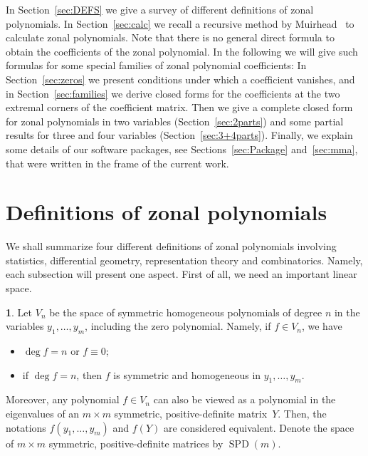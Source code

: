 \documentclass{mathincs}
\numberwithin{equation}{section}
\numberwithin{figure}{section}
\theoremstyle{plain}
\theoremstyle{definition}
\newtheorem{defn}[thm]{\protect\definitionname}
\theoremstyle{remark}
\theoremstyle{plain}
\theoremstyle{definition}
\theoremstyle{plain}
\theoremstyle{plain}
\newcommand{\SPD}{\operatorname{SPD}}
\providecommand{\definitionname}{Definition}
\begin{document}
In Section~\ref{sec:DEFS} we give a survey
of different definitions of zonal polynomials. In Section~\ref{sec:calc} we
recall a recursive method by Muirhead~\cite{Muirhead} to calculate zonal
polynomials. Note that there is no general direct formula to obtain the
coefficients of the zonal polynomial.  In the following we will give such
formulas for some special families of zonal polynomial coefficients: In
Section~\ref{sec:zeros} we present conditions under which a
coefficient vanishes, and in Section~\ref{sec:families} we derive closed
forms for the coefficients at the two extremal corners of the coefficient
matrix. Then we give a complete closed form for zonal polynomials in two
variables (Section~\ref{sec:2parts}) and some partial results for three and
four variables (Section~\ref{sec:3+4parts}). Finally, we explain some details
of our software packages, see Sections~\ref{sec:Package} and~\ref{sec:mma},
that were written in the frame of the current work.


\section{\label{sec:DEFS}Definitions of zonal polynomials}

We shall summarize four different definitions of zonal polynomials
involving statistics, differential geometry, representation theory
and combinatorics. Namely, each subsection will present one aspect. 
First of all, we need an important linear space.
\begin{defn}
Let $V_{n}$ be the space of symmetric homogeneous polynomials of
degree $n$ in the variables $y_{1},\ldots,y_{m}$, including the zero polynomial.
Namely, if $f\in V_{n}$, we have 
\begin{itemize}
\item $\deg f=n$ or $f\equiv0$;
\item if $\deg f=n$, then $f$ is symmetric and homogeneous in $y_{1},\ldots,y_{m}$.
\end{itemize}
Moreover, any polynomial $f\in V_{n}$ can also be viewed as a polynomial
in the eigenvalues of an $m\times m$ symmetric, positive-definite matrix~$Y$.
Then, the notations $f(y_1,\dots,y_m)$ and $f(Y)$ are considered equivalent.
Denote the space of $m\times m$ symmetric, positive-definite matrices
by $\SPD(m)$. 
\end{defn}
\end{document}
